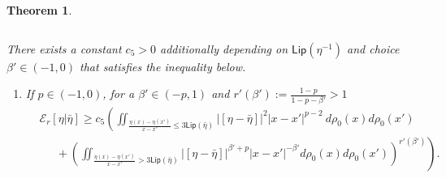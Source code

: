 \documentclass[10pt, letterpaper]{article}
\def\E{{\mathcal{E}}}
\def\Lip{{\textsf{Lip}}}
\newtheorem{theorem}{Theorem}
\theoremstyle{definition}
\theoremstyle{remark}
\begin{document}
\begin{theorem}
\begin{enumerate}
\begin{equation}
       \end{equation}
\end{enumerate}
There exists a constant $c_5>0$ additionally depending on $\Lip(\eta^{-1})$ and choice $\beta'\in(-1,0)$ that satisfies the inequality below.
\begin{enumerate}
 \item[5.] If $p\in(-1,0)$, for a $\beta' \in(-p,1)$ and $r'(\beta'):=\frac{1-p}{1-p-\beta'}>1$
 \begin{equation}\label{Lp2}
  \begin{aligned}
   &\E_r[\eta|\bar\eta] \ge c_5 \left(\iint_{\frac{\eta(x)-\eta(x')}{x-x'} \le 3\Lip(\bar\eta)}\big|[\eta - \bar\eta]\big|^2 |x-x'|^{p-2}\:d\rho_0(x)d\rho_0(x')\right. \\
 & ~~ \quad+\left.\left(\iint_{\frac{\eta(x)-\eta(x')}{x-x'} > 3\Lip(\bar\eta)}\big|[\eta - \bar\eta]\big|^{\beta'+p}|x-x'|^{-\beta'} d\rho_0(x)d\rho_0(x')\right)^{r'(\beta')}\right).
  \end{aligned}
 \end{equation}
\end{enumerate}

% 
\end{theorem}
\end{document}
